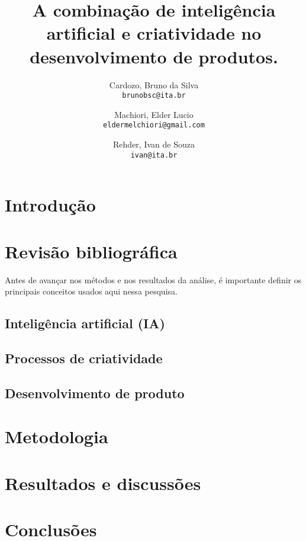 \documentclass[a4paper, 10pt, dvipsnames]{article}
\title{A combinação de inteligência artificial e criatividade no desenvolvimento de produtos.}
\author{
  Cardozo, Bruno da Silva\\
  \texttt{brunobsc@ita.br}
  \and
  Machiori, Elder Lucio\\
  \texttt{eldermelchiori@gmail.com}
  \and
  Rehder, Ivan de Souza\\
  \texttt{ivan@ita.br}
}
\begin{document}
\maketitle

\begin{abstract}

\end{abstract}

\section{Introdução}


\section{Revisão bibliográfica}

Antes de avançar nos métodos e nos resultados da análise, é importante definir os principais conceitos usados aqui nessa pesquisa.

\subsection{Inteligência artificial (IA)}


\subsection{Processos de criatividade}


\subsection{Desenvolvimento de produto}


\section{Metodologia}


\section{Resultados e discussões}


\section{Conclusões}


%

\end{document}
